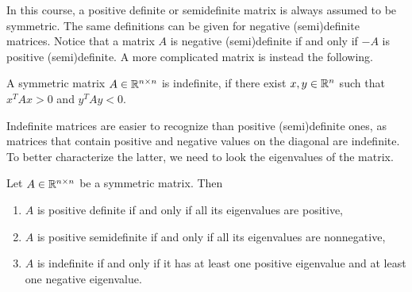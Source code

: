 \documentclass[10pt,a4paper]{article}
\begin{document}
\noindent In this course, a positive definite or semidefinite matrix is always assumed to be symmetric. The same definitions can be given for negative (semi)definite matrices. Notice that a matrix $A$ is negative (semi)definite if and only if $-A$ is positive (semi)definite. A more complicated matrix is instead the following.
\begin{definition}[Indefiniteness]
	A symmetric matrix $A\in \mathbb{R}^{n\times n}$ is indefinite, if there exist $x,y \in \mathbb{R}^n$ such that $x^TAx> 0$ and $y^TAy<0$.
\end{definition}
Indefinite matrices are easier to recognize than positive (semi)definite ones, as matrices that contain positive and negative values on the diagonal are indefinite. To better characterize the latter, we need to look the eigenvalues of the matrix.
\begin{theorem}
	Let $A\in \mathbb{R}^{n\times n}$ be a symmetric matrix. Then
	\begin{enumerate}
		\item $A$ is positive definite if and only if all its eigenvalues are positive,
		\item $A$ is positive semidefinite if and only if all its eigenvalues are nonnegative,
		\item $A$ is indefinite if and only if it has at least one positive eigenvalue and at least one
		negative eigenvalue.
	\end{enumerate}
\end{theorem}
\end{document}
